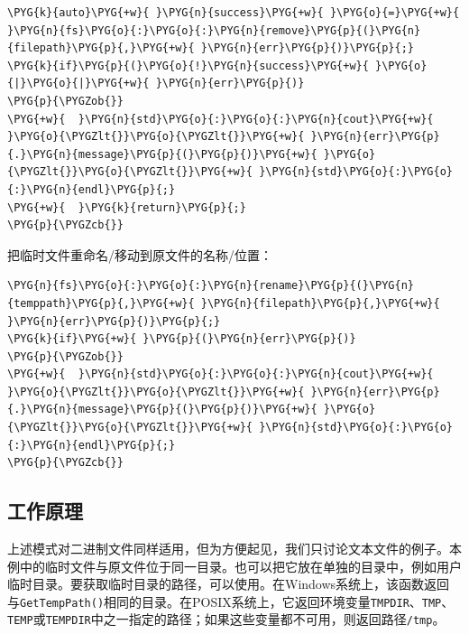 \begin{codeblockbg}
\begin{Verbatim}[commandchars=\\\{\},breaklines=true,breakanywhere=true,fontsize=\codefont,xleftmargin=17bp]
\PYG{k}{auto}\PYG{+w}{ }\PYG{n}{success}\PYG{+w}{ }\PYG{o}{=}\PYG{+w}{ }\PYG{n}{fs}\PYG{o}{:}\PYG{o}{:}\PYG{n}{remove}\PYG{p}{(}\PYG{n}{filepath}\PYG{p}{,}\PYG{+w}{ }\PYG{n}{err}\PYG{p}{)}\PYG{p}{;}
\PYG{k}{if}\PYG{p}{(}\PYG{o}{!}\PYG{n}{success}\PYG{+w}{ }\PYG{o}{|}\PYG{o}{|}\PYG{+w}{ }\PYG{n}{err}\PYG{p}{)}
\PYG{p}{\PYGZob{}}
\PYG{+w}{  }\PYG{n}{std}\PYG{o}{:}\PYG{o}{:}\PYG{n}{cout}\PYG{+w}{ }\PYG{o}{\PYGZlt{}}\PYG{o}{\PYGZlt{}}\PYG{+w}{ }\PYG{n}{err}\PYG{p}{.}\PYG{n}{message}\PYG{p}{(}\PYG{p}{)}\PYG{+w}{ }\PYG{o}{\PYGZlt{}}\PYG{o}{\PYGZlt{}}\PYG{+w}{ }\PYG{n}{std}\PYG{o}{:}\PYG{o}{:}\PYG{n}{endl}\PYG{p}{;}
\PYG{+w}{  }\PYG{k}{return}\PYG{p}{;}
\PYG{p}{\PYGZcb{}}
\end{Verbatim}
\end{codeblockbg}



把临时文件重命名/移动到原文件的名称/位置：



\begin{codeblockbg}
\begin{Verbatim}[commandchars=\\\{\},breaklines=true,breakanywhere=true,fontsize=\codefont,xleftmargin=17bp]
\PYG{n}{fs}\PYG{o}{:}\PYG{o}{:}\PYG{n}{rename}\PYG{p}{(}\PYG{n}{temppath}\PYG{p}{,}\PYG{+w}{ }\PYG{n}{filepath}\PYG{p}{,}\PYG{+w}{ }\PYG{n}{err}\PYG{p}{)}\PYG{p}{;}
\PYG{k}{if}\PYG{+w}{ }\PYG{p}{(}\PYG{n}{err}\PYG{p}{)}
\PYG{p}{\PYGZob{}}
\PYG{+w}{  }\PYG{n}{std}\PYG{o}{:}\PYG{o}{:}\PYG{n}{cout}\PYG{+w}{ }\PYG{o}{\PYGZlt{}}\PYG{o}{\PYGZlt{}}\PYG{+w}{ }\PYG{n}{err}\PYG{p}{.}\PYG{n}{message}\PYG{p}{(}\PYG{p}{)}\PYG{+w}{ }\PYG{o}{\PYGZlt{}}\PYG{o}{\PYGZlt{}}\PYG{+w}{ }\PYG{n}{std}\PYG{o}{:}\PYG{o}{:}\PYG{n}{endl}\PYG{p}{;}
\PYG{p}{\PYGZcb{}}
\end{Verbatim}
\end{codeblockbg}



\subsection{工作原理}



上述模式对二进制文件同样适用，但为方便起见，我们只讨论文本文件的例子。本例中的临时文件与原文件位于同一目录。也可以把它放在单独的目录中，例如用户临时目录。要获取临时目录的路径，可以使用。在Windows系统上，该函数返回与\texttt{GetTempPath()}相同的目录。在POSIX系统上，它返回环境变量\texttt{TMPDIR}、\texttt{TMP}、\texttt{TEMP}或\texttt{TEMPDIR}中之一指定的路径；如果这些变量都不可用，则返回路径\texttt{/\allowbreak{}tmp}。


